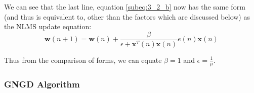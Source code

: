 \documentclass[./main.tex]{subfiles}
\begin{document}
We can see that the last line, equation \ref{subeq:3_2_b} now has the same form (and thus is equivalent to, other than the factors which are discussed below) as the NLMS update equation:
$$ \mathbf{w}(n+1) = \mathbf{w}(n) + \frac{\beta}{\epsilon + \mathbf{x}^T(n)\mathbf{x}(n)} e(n) \mathbf{x}(n) $$

Thus from the comparison of forms, we can equate $ \beta = 1 $ and $ \epsilon = \frac{1}{\mu} $.

\subsubsection{GNGD Algorithm}
\end{document}
